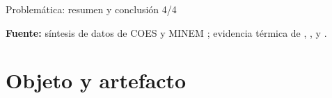 \documentclass[aspectratio=169,12pt]{beamer}
\begin{document}
\begin{frame}{Problemática: resumen y conclusión 4/4}
\vspace{0.010\paperheight}
{\raggedright\fontsize{5.9}{6.8}\selectfont\textcolor{textgray!88}{%
\textbf{Fuente:} síntesis de datos de COES y MINEM \parencite{coesEstadisticasAnuales,coesMaximaDemanda,minem2025anuario2024,minem2025indicadoresDiciembre}; evidencia térmica de \textcite{khumalo2025}, \textcite{ariasVelasquez2023}, \textcite{atoccsa2024} y \textcite{kim2025}.}\par}
\end{frame}

\section{Objeto y artefacto}
\end{document}
